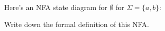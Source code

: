   Here's an NFA state diagram
  for $\emptyset$ for $\Sigma = \{a,b\}$:


Write down the formal definition of this NFA.
